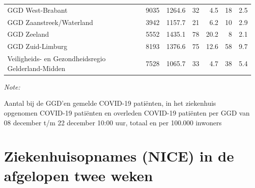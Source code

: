 \documentclass[
  english,
  man,floatsintext]{apa6}
\begin{document}
\begin{table}
\begin{threeparttable}
\begin{tabular}{lrrrrrr}
GGD West-Brabant & 9035 & 1264.6 & 32 & 4.5 & 18 & 2.5\\
GGD Zaanstreek/Waterland & 3942 & 1157.7 & 21 & 6.2 & 10 & 2.9\\
GGD Zeeland & 5552 & 1435.1 & 78 & 20.2 & 8 & 2.1\\
GGD Zuid-Limburg & 8193 & 1376.6 & 75 & 12.6 & 58 & 9.7\\
Veiligheids- en Gezondheidsregio Gelderland-Midden & 7528 & 1065.7 & 33 & 4.7 & 38 & 5.4\\
\bottomrule
\end{tabular}
\begin{tablenotes}
\item \textit{Note: } 
\item Aantal bij de GGD’en gemelde COVID-19 patiënten, in het ziekenhuis opgenomen COVID-19 patiënten en overleden COVID-19 patiënten per GGD van 08 december t/m 22 december 10:00 uur, totaal en per 100.000 inwoners
\end{tablenotes}
\end{threeparttable}
\endgroup{}
\end{table}

\newpage

\hypertarget{ziekenhuisopnames-nice-in-de-afgelopen-twee-weken}{%
\section{Ziekenhuisopnames (NICE) in de afgelopen twee weken}\label{ziekenhuisopnames-nice-in-de-afgelopen-twee-weken}}
\end{document}
